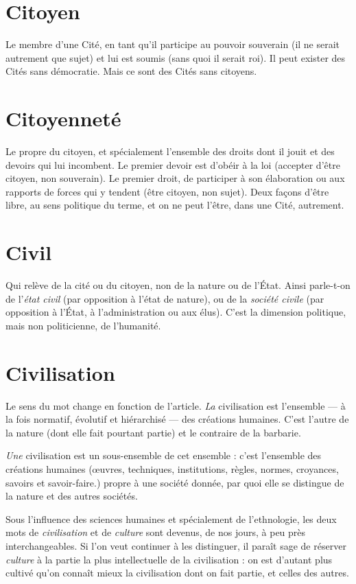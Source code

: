\section{Citoyen}
Le membre d’une Cité, en tant qu’il participe au pouvoir souverain
(il ne serait autrement que sujet) et lui est soumis (sans quoi
il serait roi).
Il peut exister des Cités sans démocratie. Mais ce sont des Cités sans
citoyens.

\section{Citoyenneté}
Le propre du citoyen, et spécialement l’ensemble des
droits dont il jouit et des devoirs qui lui incombent. Le
premier devoir est d’obéir à la loi (accepter d’être citoyen, non souverain). Le
premier droit, de participer à son élaboration ou aux rapports de forces qui y
tendent (être citoyen, non sujet). Deux façons d’être libre, au sens politique du
terme, et on ne peut l'être, dans une Cité, autrement.

\section{Civil}
Qui relève de la cité ou du citoyen, non de la nature ou de l’État.
Ainsi parle-t-on de l’{\it état civil} (par opposition à l’état de nature), ou
de la {\it société civile} (par opposition à l’État, à l'administration ou aux élus). C’est
la dimension politique, mais non politicienne, de l’humanité.

\section{Civilisation}
Le sens du mot change en fonction de l’article.
{\it La} civilisation est l’ensemble — à la fois normatif, évolutif
et hiérarchisé — des créations humaines. C’est l’autre de la nature (dont elle fait
pourtant partie) et le contraire de la barbarie.

{\it Une} civilisation est un sous-ensemble de cet ensemble : c’est l’ensemble des
créations humaines (œuvres, techniques, institutions, règles, normes, croyances,
savoirs et savoir-faire.) propre à une société donnée, par quoi elle se distingue
de la nature et des autres sociétés.

Sous l'influence des sciences humaines et spécialement de l’ethnologie, les
deux mots de {\it civilisation} et de {\it culture} sont devenus, de nos jours, à peu près
interchangeables. Si l’on veut continuer à les distinguer, il paraît sage de
réserver {\it culture} à la partie la plus intellectuelle de la civilisation : on est d’autant
plus cultivé qu’on connaît mieux la civilisation dont on fait partie, et celles des
autres.


